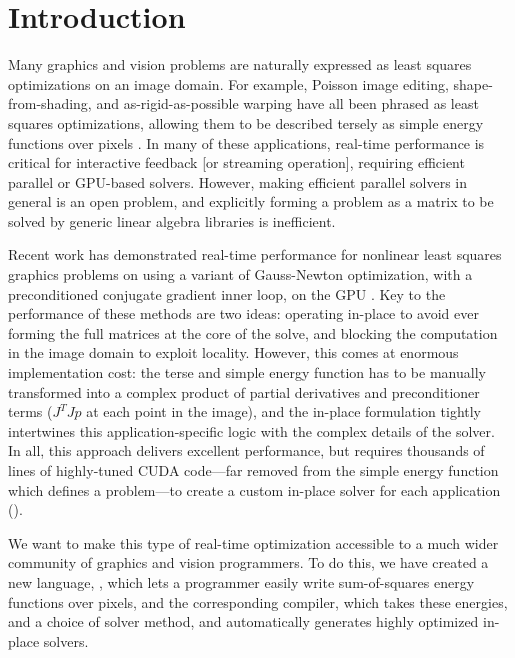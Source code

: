 \section{Introduction}
\label{sec:intro}

Many graphics and vision problems are naturally expressed as least squares optimizations on an image domain.
For example, Poisson image editing, shape-from-shading, and as-rigid-as-possible warping have all been phrased as least squares optimizations, allowing them to be described tersely as simple energy functions over pixels .
In many of these applications, real-time performance is critical for interactive feedback [or streaming operation], requiring efficient parallel or GPU-based solvers.
However, making efficient parallel solvers in general is an open problem, and explicitly forming a problem as a matrix to be solved by generic linear algebra libraries is inefficient.

Recent work has demonstrated real-time performance for nonlinear least squares graphics problems on using a variant of Gauss-Newton optimization, with a preconditioned conjugate gradient inner loop, on the GPU .
Key to the performance of these methods are two ideas: operating in-place to avoid ever forming the full matrices at the core of the solve, and blocking the computation in the image domain to exploit locality.
However, this comes at enormous implementation cost:
the terse and simple energy function has to be manually transformed into a complex product of partial derivatives and preconditioner terms ($J^TJp$ at each point in the image),
and the in-place formulation tightly intertwines this application-specific logic with the complex details of the solver.
In all, this approach delivers excellent performance, but requires thousands of lines of highly-tuned CUDA code---far removed from the simple energy function which defines a problem---to create a custom in-place solver for each application ().

We want to make this type of real-time optimization accessible to a much wider community of graphics and vision programmers.
To do this, we have
created a new language, \OPT, which lets a programmer easily write sum-of-squares energy functions over pixels,
and the corresponding compiler, which takes these energies, and a choice of solver method, and automatically generates highly optimized in-place solvers.

